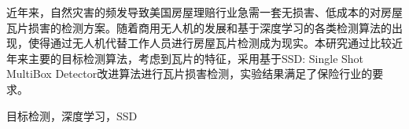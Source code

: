 \begin{uscabstract}
近年来，自然灾害的频发导致美国房屋理赔行业急需一套无损害、低成本的对房屋瓦片损害的检测方案。随着商用无人机的发展和基于深度学习的各类检测算法的出现，使得通过无人机代替工作人员进行房屋瓦片检测成为现实。本研究通过比较近年来主要的目标检测算法，考虑到瓦片的特征，采用基于SSD: Single Shot MultiBox Detector\cite{ssd}改进算法进行瓦片损害检测，实验结果满足了保险行业的要求。
\end{uscabstract}
\begin{usckeywords}
目标检测，深度学习，SSD
\end{usckeywords}

